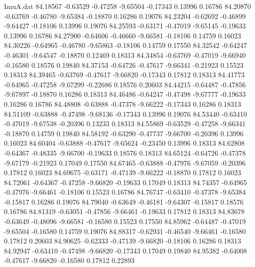 \begin{filecontents}{ImuA.dat}
  84.18567   -0.63529   -0.47258   -9.65504   -0.17343    0.13996    0.16786
  84.20870   -0.63769   -0.46780   -9.65384   -0.18870    0.16286    0.19076
  84.23204   -0.62692   -0.46899   -9.64427   -0.18106    0.13996    0.19076
  84.25593   -0.63171   -0.47019   -9.65145   -0.19633    0.13996    0.16786
  84.27900   -0.64606   -0.46660   -9.66581   -0.18106    0.14759    0.16023
  84.30226   -0.64965   -0.46780   -9.65863   -0.18106    0.14759    0.17550
  84.32542   -0.64247   -0.46301   -9.64547   -0.18870    0.12469    0.18313
  84.34854   -0.63769   -0.47019   -9.66940   -0.16580    0.18576    0.19840
  84.37153   -0.64726   -0.47617   -9.66341   -0.21923    0.15523    0.18313
  84.39465   -0.63769   -0.47617   -9.66820   -0.17343    0.17812    0.18313
  84.41773   -0.64965   -0.47258   -9.67299   -0.22686    0.18576    0.20603
  84.44215   -0.64487   -0.47856   -9.67897   -0.18870    0.16286    0.18313
  84.46486   -0.64247   -0.47498   -9.67777   -0.19633    0.16286    0.16786
  84.48808   -0.63888   -0.47378   -9.66222   -0.17343    0.16286    0.18313
  84.51109   -0.63888   -0.47498   -9.68136   -0.17343    0.13996    0.19076
  84.53440   -0.63410   -0.47019   -9.67538   -0.20396    0.13233    0.18313
  84.55869   -0.63529   -0.47258   -9.66341   -0.18870    0.14759    0.19840
  84.58192   -0.63290   -0.47737   -9.66700   -0.20396    0.13996    0.16023
  84.60404   -0.63888   -0.47617   -9.65624   -0.23450    0.13996    0.18313
  84.62808   -0.64367   -0.48335   -9.66700   -0.19633    0.18576    0.18313
  84.65124   -0.64726   -0.47378   -9.67179   -0.21923    0.17049    0.17550
  84.67465   -0.63888   -0.47976   -9.67059   -0.20396    0.17812    0.16023
  84.69675   -0.63171   -0.47139   -9.66222   -0.18870    0.17812    0.16023
  84.72061   -0.64367   -0.47258   -9.66820   -0.19633    0.17049    0.18313
  84.74357   -0.64965   -0.47976   -9.66461   -0.18106    0.15523    0.16786
  84.76747   -0.63410   -0.47378   -9.65384   -0.15817    0.16286    0.19076
  84.79040   -0.63649   -0.46181   -9.64307   -0.15817    0.18576    0.16786
  84.81319   -0.63051   -0.47856   -9.66461   -0.19633    0.17812    0.18313
  84.83678   -0.63649   -0.48096   -9.66581   -0.16580    0.15523    0.17550
  84.85962   -0.64487   -0.47019   -9.65504   -0.16580    0.14759    0.19076
  84.88317   -0.62931   -0.46540   -9.66461   -0.16580    0.17812    0.20603
  84.90625   -0.62333   -0.47139   -9.66820   -0.18106    0.16286    0.18313
  84.92947   -0.63410   -0.47498   -9.66820   -0.17343    0.17049    0.19840
  84.95382   -0.64008   -0.47617   -9.66820   -0.16580    0.17812    0.22893

\end{filecontents}

